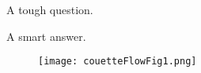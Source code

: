 \documentclass{article}
\begin{document}
\begin{Exercise}[title={foo}, label=ex1]
A tough question.
\end{Exercise}

\begin{Answer}[ref={ex1}]
A smart answer.

\begin{figure}[htp]
   \centering
   \texttt{[image: couetteFlowFig1.png]}
   \label{fig:ex1}
\end{figure}
\end{Answer}
\end{document}
